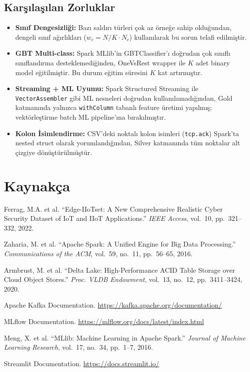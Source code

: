 \documentclass[12pt,a4paper]{article}
\begin{document}
\subsection{Karşılaşılan Zorluklar}
\begin{itemize}[noitemsep]
  \item \textbf{Sınıf Dengesizliği:} Bazı saldırı türleri çok az örneğe sahip olduğundan, dengeli sınıf ağırlıkları ($w_c = N / K \cdot N_c$) kullanılarak bu sorun telafi edilmiştir.
  \item \textbf{GBT Multi-class:} Spark MLlib'in GBTClassifier'ı doğrudan çok sınıflı sınıflandırma desteklemediğinden, OneVsRest wrapper ile $K$ adet binary model eğitilmiştir. Bu durum eğitim süresini $K$ kat artırmıştır.
  \item \textbf{Streaming + ML Uyumu:} Spark Structured Streaming ile \texttt{VectorAssembler} gibi ML nesneleri doğrudan kullanılamadığından, Gold katmanında yalnızca \texttt{withColumn} tabanlı feature üretimi yapılmış; vektörleştirme batch ML pipeline'ına bırakılmıştır.
  \item \textbf{Kolon İsimlendirme:} CSV'deki noktalı kolon isimleri (\texttt{tcp.ack}) Spark'ta nested struct olarak yorumlandığından, Silver katmanında tüm noktalar alt çizgiye dönüştürülmüştür.
\end{itemize}

\section*{Kaynakça}
\begin{enumerate}[label={[\arabic*]},noitemsep]
  \item Ferrag, M.A. et al. ``Edge-IIoTset: A New Comprehensive Realistic Cyber Security Dataset of IoT and IIoT Applications.'' \textit{IEEE Access}, vol.~10, pp.~321--332, 2022.
  \item Zaharia, M. et al. ``Apache Spark: A Unified Engine for Big Data Processing.'' \textit{Communications of the ACM}, vol.~59, no.~11, pp.~56--65, 2016.
  \item Armbrust, M. et al. ``Delta Lake: High-Performance ACID Table Storage over Cloud Object Stores.'' \textit{Proc. VLDB Endowment}, vol.~13, no.~12, pp.~3411--3424, 2020.
  \item Apache Kafka Documentation. \url{https://kafka.apache.org/documentation/}
  \item MLflow Documentation. \url{https://mlflow.org/docs/latest/index.html}
  \item Meng, X. et al. ``MLlib: Machine Learning in Apache Spark.'' \textit{Journal of Machine Learning Research}, vol.~17, no.~34, pp.~1--7, 2016.
  \item Streamlit Documentation. \url{https://docs.streamlit.io/}
\end{enumerate}
\end{document}

